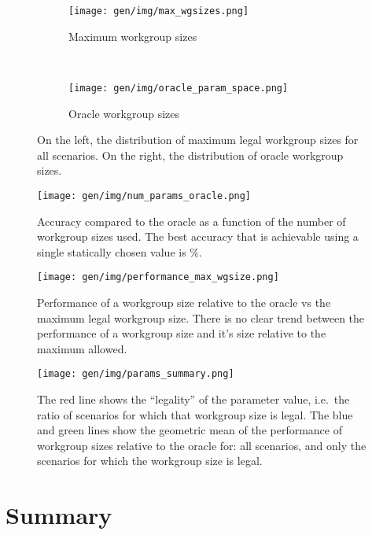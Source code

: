\begin{figure}
\begin{subfigure}[t]{0.45\textwidth}
\centering
\texttt{[image: gen/img/max\_wgsizes.png]}
\vspace{-1.5em} %
\caption{Maximum workgroup sizes}
\label{fig:max-wgsizes}
\end{subfigure}
~%
\begin{subfigure}[t]{0.45\textwidth}
\centering
\texttt{[image: gen/img/oracle\_param\_space.png]}
\vspace{-1.5em} %
\caption{Oracle workgroup sizes}
\label{fig:oracle-wgsizes}
\end{subfigure}
\caption{%
  On the left, the distribution of maximum legal workgroup sizes for
  all scenarios. On the right, the distribution of oracle workgroup
  sizes.%
}
\label{fig:heatmaps}
\end{figure}

\begin{figure}
\centering
\texttt{[image: gen/img/num\_params\_oracle.png]}
\caption{%
  Accuracy compared to the oracle as a function of the number of
  workgroup sizes used. The best accuracy that is achievable using a
  single statically chosen value is
  \protect\%.%
}
\label{fig:oracle-accuracy}
\end{figure}

\begin{figure}
\centering
\texttt{[image: gen/img/performance\_max\_wgsize.png]}
\caption{%
  Performance of a workgroup size relative to the oracle vs the
  maximum legal workgroup size. There is no clear trend between the
  performance of a workgroup size and it's size relative to the
  maximum allowed.%
}
\end{figure}

\begin{figure}
\centering
\texttt{[image: gen/img/params\_summary.png]}
\caption{%
  The red line shows the ``legality'' of the parameter value, i.e.\
  the ratio of scenarios for which that workgroup size is legal.  The
  blue and green lines show the geometric mean of the performance of
  workgroup sizes relative to the oracle for: all scenarios, and only
  the scenarios for which the workgroup size is legal.%
}
\end{figure}


\section{Summary}

